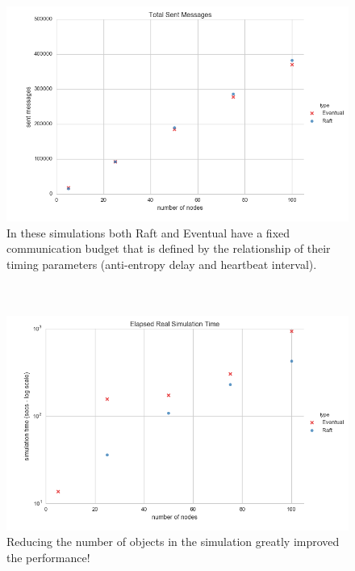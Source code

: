 \documentclass[11pt,letterpaper]{article}
\begin{document}
%

\begin{figure}[!h]
    \centering
        \includegraphics[width=\textwidth]{hcfigures/messages_sent.png}
        \caption{\textsf{In these simulations both Raft and Eventual have a fixed communication budget that is defined by the relationship of their timing parameters (anti-entropy delay and heartbeat interval).\\
\\
\\}}
        \label{fig:messages_sent}
\end{figure}

\begin{figure}[!h]
    \centering
        \includegraphics[width=\textwidth]{hcfigures/simulation_time.png}
        \caption{\textsf{Reducing the number of objects in the simulation greatly improved the performance!}}
        \label{fig:simulation_time}
\end{figure}
\end{document}
